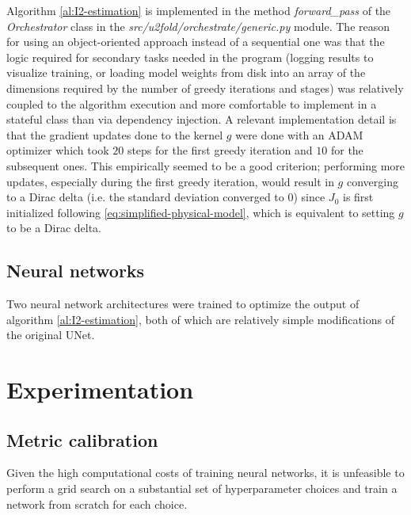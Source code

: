 \documentclass[twocolumn,twoside,a4paper,10pt]{IEEEtran}
\begin{document}
Algorithm \ref{al:I2-estimation} is implemented in the method \textit{forward\_pass} of the \textit{Orchestrator} class in the \textit{src/u2fold/orchestrate/generic.py} module. The reason for using an object-oriented
approach instead of a sequential one was that the logic required for secondary tasks needed in the program (logging results to visualize training, or loading model weights from disk into an array of the dimensions required by the number of greedy iterations and stages) was relatively coupled to the algorithm execution
and more comfortable to implement in a stateful class than via dependency injection. A relevant implementation detail is that the gradient updates done
to the kernel \(g\) were done with an ADAM optimizer which took \(20\) steps for
the first greedy iteration and \(10\) for the subsequent ones. This empirically
seemed to be a good criterion; performing more updates, especially during the first
greedy iteration, would result in \(g\) converging to a Dirac delta (i.e. the standard deviation converged to \(0\)) since \(J_0\) is first initialized following \cref{eq:simplified-physical-model}, which is equivalent to setting
\(g\) to be a Dirac delta.

\subsection{Neural networks}
Two neural network architectures were trained to optimize the output of
algorithm \ref{al:I2-estimation}, both of which are relatively simple modifications
of the original UNet.


\section{Experimentation}
\subsection{Metric calibration}
Given the high computational costs of training neural networks, it is unfeasible to perform a grid search on a substantial set of hyperparameter choices and train a network from scratch for each choice.
\end{document}
